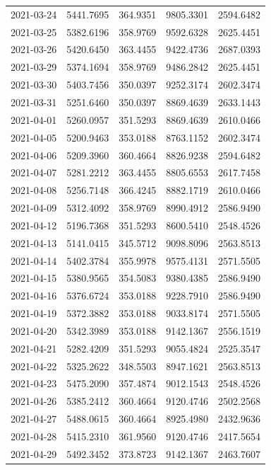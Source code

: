 {\begin{longtable}{lllll}
2021-03-24 & 5441.7695 & 364.9351 & 9805.3301 & 2594.6482 \\
2021-03-25 & 5382.6196 & 358.9769 & 9592.6328 & 2625.4451 \\
2021-03-26 & 5420.6450 & 363.4455 & 9422.4736 & 2687.0393 \\
2021-03-29 & 5374.1694 & 358.9769 & 9486.2842 & 2625.4451 \\
2021-03-30 & 5403.7456 & 350.0397 & 9252.3174 & 2602.3474 \\
2021-03-31 & 5251.6460 & 350.0397 & 8869.4639 & 2633.1443 \\
2021-04-01 & 5260.0957 & 351.5293 & 8869.4639 & 2610.0466 \\
2021-04-05 & 5200.9463 & 353.0188 & 8763.1152 & 2602.3474 \\
2021-04-06 & 5209.3960 & 360.4664 & 8826.9238 & 2594.6482 \\
2021-04-07 & 5281.2212 & 363.4455 & 8805.6553 & 2617.7458 \\
2021-04-08 & 5256.7148 & 366.4245 & 8882.1719 & 2610.0466 \\
2021-04-09 & 5312.4092 & 358.9769 & 8990.4912 & 2586.9490 \\
2021-04-12 & 5196.7368 & 351.5293 & 8600.5410 & 2548.4526 \\
2021-04-13 & 5141.0415 & 345.5712 & 9098.8096 & 2563.8513 \\
2021-04-14 & 5402.3784 & 355.9978 & 9575.4131 & 2571.5505 \\
2021-04-15 & 5380.9565 & 354.5083 & 9380.4385 & 2586.9490 \\
2021-04-16 & 5376.6724 & 353.0188 & 9228.7910 & 2586.9490 \\
2021-04-19 & 5372.3882 & 353.0188 & 9033.8174 & 2571.5505 \\
2021-04-20 & 5342.3989 & 353.0188 & 9142.1367 & 2556.1519 \\
2021-04-21 & 5282.4209 & 351.5293 & 9055.4824 & 2525.3547 \\
2021-04-22 & 5325.2622 & 348.5503 & 8947.1621 & 2563.8513 \\
2021-04-23 & 5475.2090 & 357.4874 & 9012.1543 & 2548.4526 \\
2021-04-26 & 5385.2412 & 360.4664 & 9120.4746 & 2502.2568 \\
2021-04-27 & 5488.0615 & 360.4664 & 8925.4980 & 2432.9636 \\
2021-04-28 & 5415.2310 & 361.9560 & 9120.4746 & 2417.5654 \\
2021-04-29 & 5492.3452 & 373.8723 & 9142.1367 & 2463.7607 \\

\end{longtable}}
